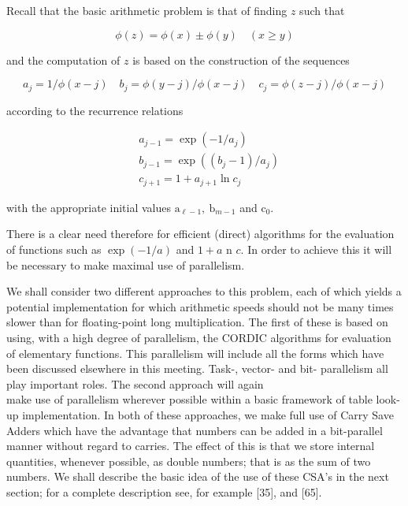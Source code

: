 \documentclass[10pt]{article}
\begin{document}
Recall that the basic arithmetic problem is that of finding $z$ such that


\begin{equation*}
\phi(z)=\phi(x) \pm \phi(y) \quad(x \geqslant y) \tag{5.1.1}
\end{equation*}


and the computation of $z$ is based on the construction of the sequences


\begin{equation*}
a_{j}=1 / \phi(x-j) \quad b_{j}=\phi(y-j) / \phi(x-j) \quad c_{j}=\phi(z-j) / \phi(x-j) \tag{5.1.2}
\end{equation*}


according to the recurrence relations


\begin{align*}
& a_{j-1}=\exp \left(-1 / a_{j}\right)  \tag{5.1.3}\\
& b_{j-1}=\exp \left(\left(b_{j}-1\right) / a_{j}\right)  \tag{5.1.4}\\
& c_{j+1}=1+a_{j+1} \ln c_{j} \tag{5.1.5}
\end{align*}


with the appropriate initial values $\mathrm{a}_{\ell-1}, \mathrm{~b}_{m-1}$ and $\mathrm{c}_{0}$.

There is a clear need therefore for efficient (direct) algorithms for the evaluation of functions such as $\exp (-1 / a)$ and $1+a$ n $c$. In order to achieve this it will be necessary to make maximal use of parallelism.

We shall consider two different approaches to this problem, each of which yields a potential implementation for which arithmetic speeds should not be many times slower than for floating-point long multiplication. The first of these is based on using, with a high degree of parallelism, the CORDIC algorithms for evaluation of elementary functions. This parallelism will include all the forms which have been discussed elsewhere in this meeting. Task-, vector- and bit- parallelism all play important roles. The second approach will again\\[0pt]
make use of parallelism wherever possible within a basic framework of table look-up implementation. In both of these approaches, we make full use of Carry Save Adders which have the advantage that numbers can be added in a bit-parallel manner without regard to carries. The effect of this is that we store internal quantities, whenever possible, as double numbers; that is as the sum of two numbers. We shall describe the basic idea of the use of these CSA's in the next section; for a complete description see, for example [35], and [65].
\end{document}

